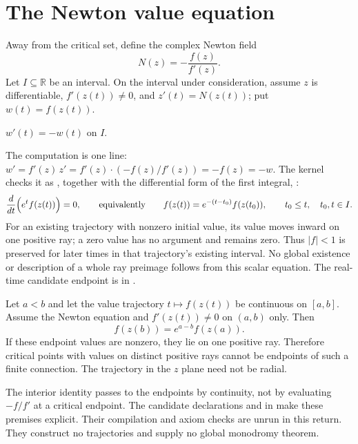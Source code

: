 \documentclass[11pt]{article}
\begin{document}
\section{The Newton value equation}\label{sec:newton}

Away from the critical set, define the complex Newton field
\[
  N(z)=-\frac{f(z)}{f'(z)} .
\]
Let $I\subseteq\mathbb R$ be an interval. On the interval under consideration,
assume $z$ is differentiable, $f'(z(t))\ne0$, and $z'(t)=N(z(t))$;
put $w(t)=f(z(t))$.

\begin{theorem}\label{res:value}
$w'(t)=-w(t)$ on $I$.
\end{theorem}

\noindent The computation is one line: $w'=f'(z)\,z'=f'(z)\cdot(-f(z)/f'(z))=-f(z)=-w$.
The kernel checks it as , together with the
differential form of the first integral,
:
\[
  \frac{d}{dt}\Bigl(e^{t}f(z(t))\Bigr)=0,
  \qquad\text{equivalently}\qquad
  f(z(t))=e^{-(t-t_0)}f(z(t_0)),\qquad t_0\le t,\quad t_0,t\in I .
\]
For an existing trajectory with nonzero initial value, its value moves
inward on one positive ray; a zero value has no argument and remains zero.
Thus $|f|<1$ is preserved for later times in that trajectory's existing
interval. No global existence or description of a whole ray preimage follows
from this scalar equation. The real-time candidate endpoint is
 in .

\begin{corollary}\label{res:ray}
Let $a<b$ and let the value trajectory $t\mapsto f(z(t))$ be continuous on
$[a,b]$. Assume the Newton equation and $f'(z(t))\ne0$ on $(a,b)$ only.
Then
\[
 f(z(b))=e^{a-b}f(z(a)).
\]
If these endpoint values are nonzero, they lie on one positive ray. Therefore
critical points with values on distinct positive rays cannot be endpoints
of such a finite connection. The trajectory in the $z$ plane need not be radial.
\end{corollary}

\noindent The interior identity passes to the endpoints by continuity, not
by evaluating $-f/f'$ at a critical endpoint. The candidate declarations
 and
in  make these
premises explicit. Their compilation and axiom checks are unrun in this
return. They construct no trajectories and supply no global monodromy theorem.
\end{document}
